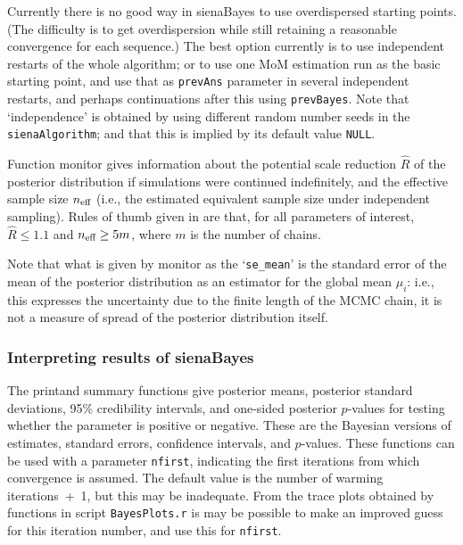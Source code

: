 \documentclass[a4paper,fleqn,11pt]{article}
\newcommand{\+}{\, + \,}
\newcommand{\sfn}[1]{\textsf{#1}}
\begin{document}
Currently there is no good way in \sfn{sienaBayes} to use
overdispersed starting points. (The difficulty is to get overdispersion
while still retaining a reasonable convergence for each sequence.)
The best option currently is to use independent restarts of the whole
algorithm; or to use one MoM estimation run as the basic starting
point, and use that as \texttt{prevAns} parameter in several independent
restarts, and perhaps continuations after this using \texttt{prevBayes}.
Note that `independence' is obtained by using different random
number seeds in the \texttt{sienaAlgorithm}; and that this is implied
by its default value \texttt{NULL}.

Function \sfn{monitor} gives information about the potential
scale reduction $\hat R$ of the posterior distribution if simulations
were continued indefinitely, and the effective sample size
$n_{\text{\scriptsize eff}}$ (i.e., the estimated equivalent
sample size under independent sampling).
Rules of thumb given in \citet[][p. 287]{BDA3} are that,
for all parameters of interest,
$\hat R \leq 1.1$ and $n_{\text{\scriptsize eff}} \geq 5m$,
where $m$ is the number of chains.

Note that what is given by \sfn{monitor} as the
`\texttt{se\_mean}' is the standard error of the mean
of the posterior distribution as an estimator for
the global mean $\mu_i$: i.e., this expresses the uncertainty
due to the finite length of the MCMC chain, it is not
a measure of spread of the posterior distribution itself.


\subsubsection{Interpreting results of sienaBayes}
\label{S_sienaBayesInterpret}

The \textsf{print}and \textsf{summary} functions
give posterior means, posterior standard deviations, 95\% credibility intervals,
and one-sided posterior $p$-values
for testing whether the parameter is positive or negative.
These are the Bayesian versions of estimates, standard errors,
confidence intervals, and $p$-values.
These functions can be used with a parameter \texttt{nfirst}, indicating
the first iterations from which convergence is assumed.
The default value is the number of warming iterations~+~1,
but this may be inadequate. From the trace plots obtained by
functions in script  \texttt{BayesPlots.r} is may be possible
to make an improved guess for this iteration number,
and use this for \texttt{nfirst}.
\end{document}
